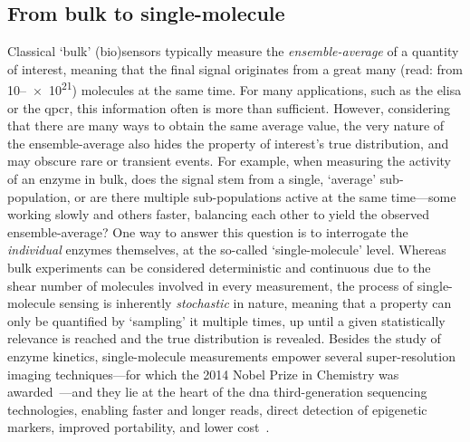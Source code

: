 \subsection{From bulk to single-molecule}

Classical `bulk' (bio)sensors typically measure the \emph{ensemble-average} of a quantity of interest, meaning
that the final signal originates from a great many (read: from \numrange{10}{e21}) molecules at the same time.
For many applications, such as the \gls{elisa} or the \gls{qpcr}, this information often is more than
sufficient. However, considering that there are many ways to obtain the same average value, the very nature of
the ensemble-average also hides the property of interest's true distribution, and may obscure rare or
transient events. For example, when measuring the activity of an enzyme in bulk, does the signal stem from a
single, `average' sub-population, or are there multiple sub-populations active at the same time---some working
slowly and others faster, balancing each other to yield the observed ensemble-average? One way to answer this
question is to interrogate the \emph{individual} enzymes themselves, at the so-called `single-molecule' level.
Whereas bulk experiments can be considered deterministic and continuous due to the shear number of molecules
involved in every measurement, the process of single-molecule sensing is inherently \emph{stochastic} in
nature, meaning that a property can only be quantified by `sampling' it multiple times, up until a given
statistically relevance is reached and the true distribution is revealed. Besides the study of enzyme
kinetics, single-molecule measurements empower several super-resolution imaging techniques---for which the
2014 Nobel Prize in Chemistry was awarded~\cite{Weiss-2014}---and they lie at the heart of the \gls{dna}
third-generation sequencing technologies, enabling faster and longer reads, direct detection of epigenetic
markers, improved portability, and lower cost~\cite{Schadt-2010}.


